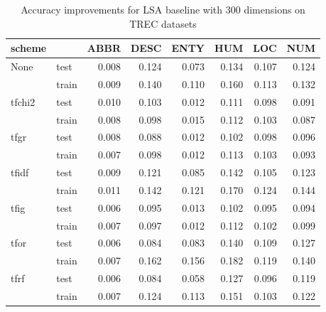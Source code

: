\begin{table}[h]
\begin{center}

\begin{tabular}{llrrrrrr}
\toprule
scheme &  &  ABBR &  DESC &  ENTY &  HUM &  LOC &  NUM \\
\midrule
None & test &     0.008 &     0.124 &     0.073 &    0.134 &    0.107 &    0.124 \\
{} & train &     0.009 &     0.140 &     0.110 &    0.160 &    0.113 &    0.132 \\
tfchi2 & test &     0.010 &     0.103 &     0.012 &    0.111 &    0.098 &    0.091 \\
{} & train &     0.008 &     0.098 &     0.015 &    0.112 &    0.103 &    0.087 \\
tfgr & test &     0.008 &     0.088 &     0.012 &    0.102 &    0.098 &    0.096 \\
{} & train &     0.007 &     0.098 &     0.012 &    0.113 &    0.103 &    0.093 \\
tfidf & test &     0.009 &     0.121 &     0.085 &    0.142 &    0.105 &    0.123 \\
{} & train &     0.011 &     0.142 &     0.121 &    0.170 &    0.124 &    0.144 \\
tfig & test &     0.006 &     0.095 &     0.013 &    0.102 &    0.095 &    0.094 \\
{} & train &     0.007 &     0.097 &     0.012 &    0.112 &    0.102 &    0.099 \\
tfor & test &     0.006 &     0.084 &     0.083 &    0.140 &    0.109 &    0.127 \\
{} & train &     0.007 &     0.162 &     0.156 &    0.182 &    0.119 &    0.140 \\
tfrf & test &     0.006 &     0.084 &     0.058 &    0.127 &    0.096 &    0.119 \\
{} & train &     0.007 &     0.124 &     0.113 &    0.151 &    0.103 &    0.122 \\
\bottomrule
\end{tabular}

\caption[Accuracy improvements for LSA baseline with 300 dimensions on TREC datasets]{Accuracy improvements for LSA baseline with 300 dimensions on TREC datasets}
\label{tab:lsa:resuts:300:TREC}
\end{center}
\end{table}





